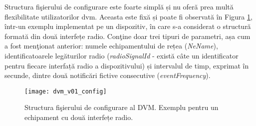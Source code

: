 Structura fişierului de configurare este foarte simplă și nu oferă prea multă flexibilitate utilizatorilor \gls{dvm}. Aceasta este fixă și poate fi observată în Figura \ref{fig:dvm_v01_config}, într-un exemplu implementat pe un dispozitiv, în care s-a considerat o structură formată din două interfețe radio. Conţine doar trei tipuri de parametri, așa cum a fost menţionat anterior: numele echipamentului de rețea (\textit{NeName}), identificatoarele legăturilor radio (\textit{radioSignalId} - există câte un identificator pentru fiecare interfață radio a dispozitivului) și intervalul de timp, exprimat în secunde, dintre două notificări fictive consecutive (\textit{eventFrequency}).

\begin{figure}[h]
	\centering
	\texttt{[image: dvm\_v01\_config]}
	\caption{Structura fişierului de configurare al DVM. Exemplu pentru un echipament cu două interfețe radio.}
	\label{fig:dvm_v01_config}
\end{figure}